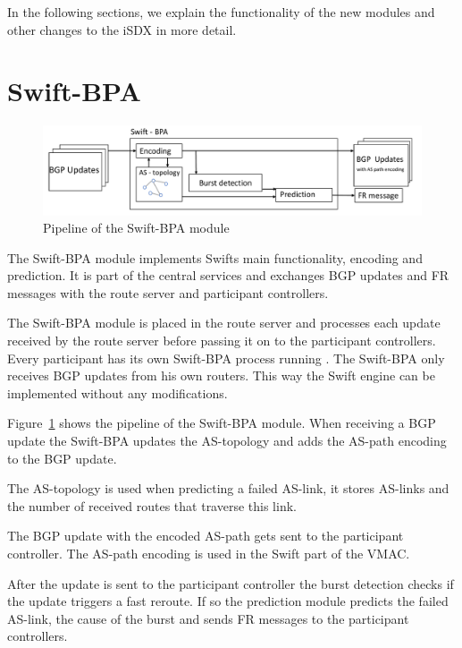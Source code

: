 In the following sections, we explain the functionality of the new modules and other changes to the iSDX in more detail.

\section{\label{chapter4:Swift-BPA}Swift-BPA}

\begin{figure}[h]
\center
\includegraphics[scale = 0.5]{Figures/design_swift_bpa_cropped.pdf}
\caption{Pipeline of the Swift-BPA module}
\label{fig:PipelineBPA}
\end{figure}

The Swift-BPA module implements Swifts main functionality, encoding and prediction. It is part of the central services and exchanges BGP updates and FR messages with the route server and participant controllers.

The Swift-BPA module is placed in the route server and processes each update received by the route server before passing it on to the participant controllers. 
Every participant has its own Swift-BPA process running . The Swift-BPA only receives BGP updates from his own routers. This way the Swift engine can be implemented without any modifications.

Figure~\ref{fig:PipelineBPA} shows the pipeline of the Swift-BPA module. When receiving a BGP update the Swift-BPA updates the AS-topology and adds the AS-path encoding to the BGP update. 

The AS-topology is used when predicting a failed AS-link, it stores AS-links and the number of received routes that traverse this link.

The BGP update with the encoded AS-path gets sent to the participant controller. The AS-path encoding is used in the Swift part of the VMAC.
 
After the update is sent to the participant controller the burst detection checks if the update triggers a fast reroute. If so the prediction module predicts the failed AS-link, the cause of the burst and sends FR messages to the participant controllers. 

